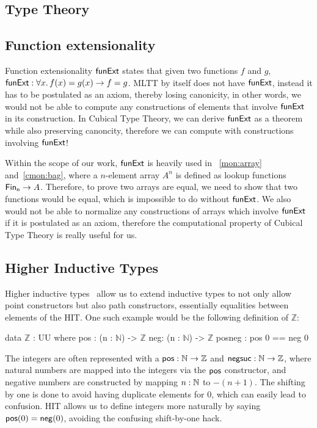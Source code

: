\begin{toappendix}
\section{Type Theory}\label{sec:type-theory}
\subsection{Function extensionality}
Function extensionality $\operatorname{\mathsf{funExt}}$ states that given two functions $f$ and $g$,
$\operatorname{\mathsf{funExt}}: \forall x.\,f(x) = g(x) \to f = g$. MLTT by itself does not have $\operatorname{\mathsf{funExt}}$,
instead it has to be postulated as an axiom, thereby losing canonicity, in other words,
we would not be able to compute any constructions of elements that involve $\operatorname{\mathsf{funExt}}$
in its construction. In Cubical Type Theory, we can derive $\operatorname{\mathsf{funExt}}$
as a theorem while also preserving canoncity, therefore we can compute with constructions
involving $\operatorname{\mathsf{funExt}}$!

Within the scope of our work, $\operatorname{\mathsf{funExt}}$ is heavily used in
~\cref{mon:array} and~\cref{cmon:bag}, where a $n$-element array $A^n$ is defined as lookup functions
$\Fin[n] \to A$. Therefore, to prove two arrays are equal, we need to show that two functions would be
equal, which is impossible to do without $\operatorname{\mathsf{funExt}}$. We also would not be able to normalize
any constructions of arrays which involve $\operatorname{\mathsf{funExt}}$ if it is postulated as an axiom, therefore
the computational property of Cubical Type Theory is really useful for us.

\subsection{Higher Inductive Types}
Higher inductive types~\cite{cavalloHigherInductiveTypes2019}
allow us to extend inductive types to not only allow point constructors
but also path constructors, essentially equalities between elements of the HIT. One such example
would be the following definition of $\mathbb{Z}$:

\vspace{-1em}
\begin{code}
data $\mathbb{Z}$ : UU where
    pos : (n : $\mathbb{N}$) -> $\mathbb{Z}$
    neg: (n : $\mathbb{N}$) -> $\mathbb{Z}$
    posneg : pos 0 == neg 0
\end{code}
\vspace{1em}

The integers are often represented with a $\operatorname{\mathsf{pos}} : \mathbb{N} \to \mathbb{Z}$
and $\operatorname{\mathsf{negsuc}} : \mathbb{N} \to \mathbb{Z}$, where natural numbers
are mapped into the integers via the $\operatorname{\mathsf{pos}}$ constructor, and negative numbers are constructed
by mapping $n : \mathbb{N}$ to $-(n + 1)$. The shifting by one is done to avoid having duplicate elements
for 0, which can easily lead to confusion. HIT allows us to define integers more naturally by saying
$\operatorname{\mathsf{pos}}(0) = \operatorname{\mathsf{neg}}(0)$, avoiding the confusing shift-by-one hack.


\end{toappendix}
